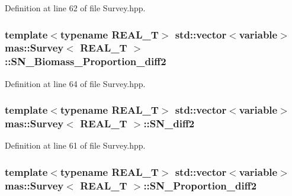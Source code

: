 Definition at line 62 of file Survey.\-hpp.

\hypertarget{structmas_1_1_survey_a2b909685f664b5453d5dfb38b84452cf}{
\subsubsection[{S\-N\-\_\-\-Biomass\-\_\-\-Proportion\-\_\-diff2}]{\setlength{\rightskip}{0pt plus 5cm}template$<$typename R\-E\-A\-L\-\_\-\-T$>$ std\-::vector$<${\bf variable}$>$ {\bf mas\-::\-Survey}$<$ R\-E\-A\-L\-\_\-\-T $>$\-::S\-N\-\_\-\-Biomass\-\_\-\-Proportion\-\_\-diff2}}\label{structmas_1_1_survey_a2b909685f664b5453d5dfb38b84452cf}


Definition at line 64 of file Survey.\-hpp.

\hypertarget{structmas_1_1_survey_aa01ce2732a42f7580f1803cef493370f}{
\subsubsection[{S\-N\-\_\-diff2}]{\setlength{\rightskip}{0pt plus 5cm}template$<$typename R\-E\-A\-L\-\_\-\-T$>$ std\-::vector$<${\bf variable}$>$ {\bf mas\-::\-Survey}$<$ R\-E\-A\-L\-\_\-\-T $>$\-::S\-N\-\_\-diff2}}\label{structmas_1_1_survey_aa01ce2732a42f7580f1803cef493370f}


Definition at line 61 of file Survey.\-hpp.

\hypertarget{structmas_1_1_survey_ad8f4967194f0217375577ef06e99df73}{
\subsubsection[{S\-N\-\_\-\-Proportion\-\_\-diff2}]{\setlength{\rightskip}{0pt plus 5cm}template$<$typename R\-E\-A\-L\-\_\-\-T$>$ std\-::vector$<${\bf variable}$>$ {\bf mas\-::\-Survey}$<$ R\-E\-A\-L\-\_\-\-T $>$\-::S\-N\-\_\-\-Proportion\-\_\-diff2}}\label{structmas_1_1_survey_ad8f4967194f0217375577ef06e99df73}


